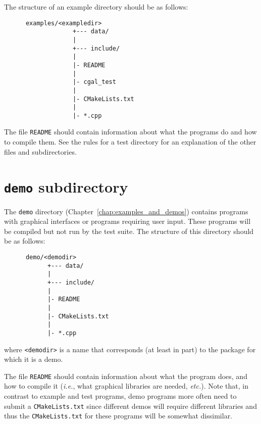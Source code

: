 The structure of an example directory should be as follows: 
\begin{verbatim}
      examples/<exampledir>
                   +--- data/
                   |
                   +--- include/
                   |
                   |- README
                   |
                   |- cgal_test
                   |
                   |- CMakeLists.txt
                   |
                   |- *.cpp
\end{verbatim}

The file {\tt README} should contain information about what the programs do
and how to compile them. 
See the rules for a test directory for an explanation of the other files 
and subdirectories. 

\section{{\tt demo} subdirectory}
\label{sec:demo_subdirectory}

The {\tt demo} directory (Chapter~\ref{chap:examples_and_demos}) contains 
programs with graphical interfaces or programs requiring user input. These 
programs will be compiled but not run by the test suite.
The structure of this directory should be as follows: 
\begin{verbatim}
      demo/<demodir>
            +--- data/
            |
            +--- include/
            |
            |- README
            |
            |- CMakeLists.txt
            |
            |- *.cpp
\end{verbatim}
where \verb|<demodir>| is a name that corresponds (at least in part) to
the package for which it is a demo.

The file {\tt README} should contain information about what the program does, 
and how to compile it ({\it i.e.}, what graphical libraries are needed, 
{\it etc.}). Note that, in contrast to example and test programs,
demo programs more often need to submit a {\tt CMakeLists.txt}
 since
different demos will require different libraries and thus the {\tt CMakeLists.txt}
for these programs will be somewhat dissimilar.


